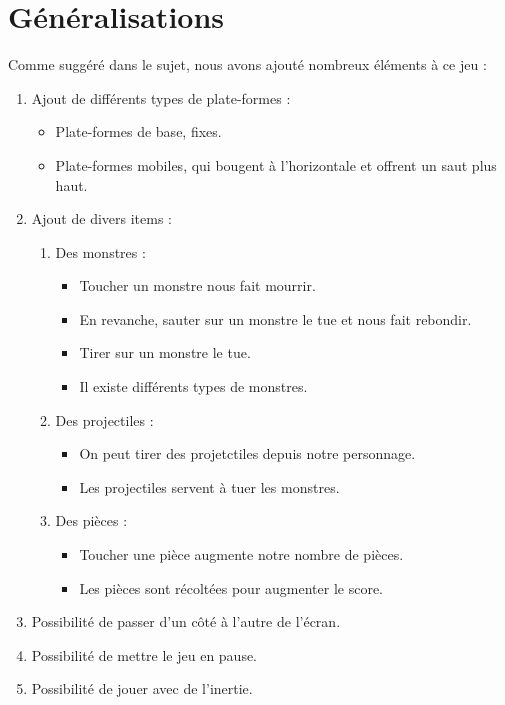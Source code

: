 \documentclass{article}
\begin{document}
\section{Généralisations}
Comme suggéré dans le sujet, nous avons ajouté nombreux éléments à ce jeu :
\begin{enumerate}
    \item Ajout de différents types de plate-formes :
    \begin{itemize}
        \item Plate-formes de base, fixes.
        \item Plate-formes mobiles, qui bougent à l'horizontale et offrent un saut plus haut.
    \end{itemize}
    \item Ajout de divers items :
    \begin{enumerate}
        \item Des monstres :
        \begin{itemize}
            \item Toucher un monstre nous fait mourrir.
            \item En revanche, sauter sur un monstre le tue et nous fait rebondir.
            \item Tirer sur un monstre le tue.
            \item Il existe différents types de monstres.
        \end{itemize}
        \item Des projectiles :
        \begin{itemize}
            \item On peut tirer des projetctiles depuis notre personnage.
            \item Les projectiles servent à tuer les monstres.
        \end{itemize}
        \item Des pièces :
        \begin{itemize}
            \item Toucher une pièce augmente notre nombre de pièces.
            \item Les pièces sont récoltées pour augmenter le score. 
        \end{itemize}        
    \end{enumerate}
    \item Possibilité de passer d'un côté à l'autre de l'écran.
    \item Possibilité de mettre le jeu en pause.
    \item Possibilité de jouer avec de l'inertie.

\end{enumerate}
\end{document}
